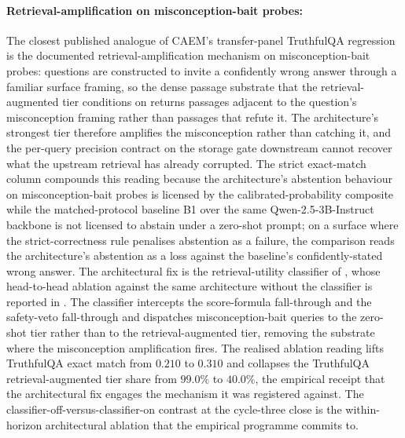 \paragraph{Retrieval-amplification on misconception-bait probes:} The closest published analogue of CAEM's transfer-panel TruthfulQA regression is the documented retrieval-amplification mechanism on misconception-bait probes: questions are constructed to invite a confidently wrong answer through a familiar surface framing, so the dense passage substrate that the retrieval-augmented tier conditions on returns passages adjacent to the question's misconception framing rather than passages that refute it. The architecture's strongest tier therefore amplifies the misconception rather than catching it, and the per-query precision contract on the storage gate downstream cannot recover what the upstream retrieval has already corrupted. The strict exact-match column compounds this reading because the architecture's abstention behaviour on misconception-bait probes is licensed by the calibrated-probability composite while the matched-protocol baseline B1 over the same Qwen-2.5-3B-Instruct backbone is not licensed to abstain under a zero-shot prompt; on a surface where the strict-correctness rule penalises abstention as a failure, the comparison reads the architecture's abstention as a loss against the baseline's confidently-stated wrong answer. The architectural fix is the retrieval-utility classifier of , whose head-to-head ablation against the same architecture without the classifier is reported in . The classifier intercepts the score-formula fall-through and the safety-veto fall-through and dispatches misconception-bait queries to the zero-shot tier rather than to the retrieval-augmented tier, removing the substrate where the misconception amplification fires. The realised ablation reading lifts TruthfulQA exact match from $0.210$ to $0.310$ and collapses the TruthfulQA retrieval-augmented tier share from $99.0\%$ to $40.0\%$, the empirical receipt that the architectural fix engages the mechanism it was registered against. The classifier-off-versus-classifier-on contrast at the cycle-three close is the within-horizon architectural ablation that the empirical programme commits to.

